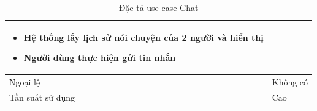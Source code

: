 \documentclass[../DoAn.tex]{subfiles}
\begin{document}
\begin{table}[H]
\begin{tabular}{|p{3cm}|p{12cm}|}
\begin{itemize}
    \item Hệ thống lấy lịch sử nói chuyện của 2 người và hiển thị 
    \item Người dùng thực hiện gửi tin nhắn
\end{itemize}                                 \\ \hline
Ngoại lệ            & Không có                                                                                            \\ \hline
Tần suất sử dụng    & Cao                                                                                                                \\ \hline
\end{tabular}
\caption{Đặc tả use case Chat}
\label{tab:my-table}
\end{table}
\newpage
\end{document}

